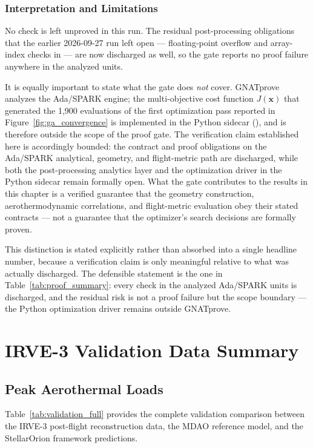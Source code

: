 \subsection{Interpretation and Limitations}
No check is left unproved in this run. The residual post-processing obligations that the earlier 2026-09-27 run left open --- floating-point overflow and array-index checks in \texttt{} --- are now discharged as well, so the gate reports no proof failure anywhere in the analyzed units.

It is equally important to state what the gate does \emph{not} cover. GNATprove analyzes the Ada/SPARK engine; the multi-objective cost function $J(\mathbf{x})$ that generated the 1,900 evaluations of the first optimization pass reported in Figure~\ref{fig:ga_convergence} is implemented in the Python sidecar (\texttt{}), and is therefore outside the scope of the proof gate. The verification claim established here is accordingly bounded: the contract and proof obligations on the Ada/SPARK analytical, geometry, and flight-metric path are discharged, while both the post-processing analytics layer and the optimization driver in the Python sidecar remain formally open. What the gate contributes to the results in this chapter is a verified guarantee that the geometry construction, aerothermodynamic correlations, and flight-metric evaluation obey their stated contracts --- not a guarantee that the optimizer's search decisions are formally proven.

This distinction is stated explicitly rather than absorbed into a single headline number, because a verification claim is only meaningful relative to what was actually discharged. The defensible statement is the one in Table~\ref{tab:proof_summary}: every check in the analyzed Ada/SPARK units is discharged, and the residual risk is not a proof failure but the scope boundary --- the Python optimization driver remains outside GNATprove.

\chapter{IRVE-3 Validation Data Summary}
\label{app:validation_data}

\section{Peak Aerothermal Loads}

Table~\ref{tab:validation_full} provides the complete validation comparison between the IRVE-3 post-flight reconstruction data, the MDAO reference model, and the StellarOrion framework predictions.

